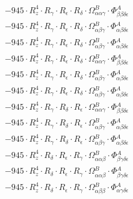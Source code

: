 \documentclass{article}
\begin{document}
\begin{subequations}
\begin{gather}
\begin{array}{c}
 \\[0.2em] 		 - 945 \cdot R_{z}^{4} \cdot R_{\gamma{}} \cdot R_{\epsilon{}} \cdot R_{\delta{}} \cdot \Omega{}^{B}_{\alpha{}\alpha{}\gamma{}} \cdot \Phi{}^{A}_{\beta{}\beta{}\delta{}\epsilon{}} 
 \\[0.2em] 		 - 945 \cdot R_{z}^{4} \cdot R_{\gamma{}} \cdot R_{\epsilon{}} \cdot R_{\delta{}} \cdot \Omega{}^{B}_{\alpha{}\beta{}\gamma{}} \cdot \Phi{}^{A}_{\alpha{}\beta{}\delta{}\epsilon{}} 
 \\[0.2em] 		 - 945 \cdot R_{z}^{4} \cdot R_{\gamma{}} \cdot R_{\epsilon{}} \cdot R_{\delta{}} \cdot \Omega{}^{B}_{\alpha{}\beta{}\gamma{}} \cdot \Phi{}^{A}_{\alpha{}\beta{}\delta{}\epsilon{}} 
 \\[0.2em] 		 - 945 \cdot R_{z}^{4} \cdot R_{\gamma{}} \cdot R_{\epsilon{}} \cdot R_{\delta{}} \cdot \Omega{}^{B}_{\alpha{}\alpha{}\gamma{}} \cdot \Phi{}^{A}_{\beta{}\beta{}\delta{}\epsilon{}} 
 \\[0.2em] 		 - 945 \cdot R_{z}^{4} \cdot R_{\gamma{}} \cdot R_{\epsilon{}} \cdot R_{\delta{}} \cdot \Omega{}^{B}_{\alpha{}\beta{}\gamma{}} \cdot \Phi{}^{A}_{\alpha{}\beta{}\delta{}\epsilon{}} 
 \\[0.2em] 		 - 945 \cdot R_{z}^{4} \cdot R_{\gamma{}} \cdot R_{\epsilon{}} \cdot R_{\delta{}} \cdot \Omega{}^{B}_{\alpha{}\beta{}\gamma{}} \cdot \Phi{}^{A}_{\alpha{}\beta{}\delta{}\epsilon{}} 
 \\[0.2em] 		 - 945 \cdot R_{z}^{4} \cdot R_{\gamma{}} \cdot R_{\delta{}} \cdot R_{\epsilon{}} \cdot \Omega{}^{B}_{\alpha{}\alpha{}\gamma{}} \cdot \Phi{}^{A}_{\beta{}\beta{}\delta{}\epsilon{}} 
 \\[0.2em] 		 - 945 \cdot R_{z}^{4} \cdot R_{\gamma{}} \cdot R_{\delta{}} \cdot R_{\epsilon{}} \cdot \Omega{}^{B}_{\alpha{}\beta{}\gamma{}} \cdot \Phi{}^{A}_{\alpha{}\beta{}\delta{}\epsilon{}} 
 \\[0.2em] 		 - 945 \cdot R_{z}^{4} \cdot R_{\gamma{}} \cdot R_{\delta{}} \cdot R_{\epsilon{}} \cdot \Omega{}^{B}_{\alpha{}\beta{}\gamma{}} \cdot \Phi{}^{A}_{\alpha{}\beta{}\delta{}\epsilon{}} 
 \\[0.2em] 		 - 945 \cdot R_{z}^{4} \cdot R_{\delta{}} \cdot R_{\epsilon{}} \cdot R_{\gamma{}} \cdot \Omega{}^{B}_{\alpha{}\alpha{}\beta{}} \cdot \Phi{}^{A}_{\beta{}\gamma{}\delta{}\epsilon{}} 
 \\[0.2em] 		 - 945 \cdot R_{z}^{4} \cdot R_{\delta{}} \cdot R_{\epsilon{}} \cdot R_{\gamma{}} \cdot \Omega{}^{B}_{\alpha{}\alpha{}\beta{}} \cdot \Phi{}^{A}_{\beta{}\gamma{}\delta{}\epsilon{}} 
 \\[0.2em] 		 - 945 \cdot R_{z}^{4} \cdot R_{\delta{}} \cdot R_{\epsilon{}} \cdot R_{\gamma{}} \cdot \Omega{}^{B}_{\alpha{}\beta{}\beta{}} \cdot \Phi{}^{A}_{\alpha{}\gamma{}\delta{}\epsilon{}} 

\end{array}
\end{gather}
\end{subequations}
\end{document}
